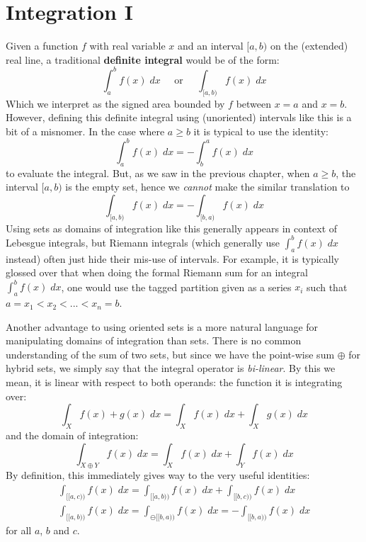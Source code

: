 \chapter{Integration I}


%
%

Given a function $f$ with real variable $x$ and an interval $[a,b)$ on the (extended) real line, 
a traditional \textbf{definite integral} would be of the form:
\begin{equation*}
	\int_a^b f(x) \; dx \;\;\;\;\; \text{or} \;\;\;\;\; \int_{[a,b)} f(x) \; dx
\end{equation*}
Which we interpret as the signed area bounded by $f$ between $x=a$ and $x=b$.
However, defining this definite integral using (unoriented) intervals like this is a bit of a misnomer.
In the case where $a \geq b$ it is typical to use the identity:
\begin{equation}
	\int_a^b f(x) \; dx = - \int_b^a f(x) \; dx
\end{equation}
to evaluate the integral.
But, as we saw in the previous chapter, when $a \geq b$, the interval $[a,b)$ is the empty set,
hence we \emph{cannot} make the similar translation to 
\begin{equation}
	\int_{[a,b)} f(x) \; dx = - \int_{[b,a)} f(x) \; dx
\end{equation}
Using sets as domains of integration like this generally appears in context of Lebesgue integrals, but 
Riemann integrals (which generally use $\int_a^b f(x) \;dx$ instead) often just hide their mis-use of intervals.
For example, it is typically glossed over that when doing the formal Riemann sum for an integral $\int_a^b f(x) \; dx$, 
one would use the tagged partition given as a series $x_i$ such that $a = x_1 < x_2 < ... < x_n = b$.


Another advantage to using oriented sets is a more natural language for manipulating domains of integration than sets.
There is no common understanding of the sum of two sets, but since we have the point-wise sum $\oplus$ for hybrid sets, we simply say that the integral operator is \emph{bi-linear}.
By this we mean, it is linear with respect to both operands: the function it is integrating over:
\begin{equation}
	\int_{X} f(x) + g(x) \; dx = \int_X f(x) \;dx + \int_X g(x) \; dx
\end{equation}
and the domain of integration:
\begin{equation}
	\int_{X\oplus Y} f(x) \; dx = \int_{X} f(x) \; dx + \int_Y f(x) \; dx
\end{equation}
By definition, this immediately gives way to the very useful identities:
\begin{align}
	\int_{[\![a,c)\!)} f(x) \; dx = \int_{[\![a,b)\!)} f(x) \; dx + \int_{[\![b,c)\!)} f(x) \; dx \\
	\int_{[\![a,b)\!)} f(x) \; dx = \int_{\ominus [\![b,a)\!)} f(x) \; dx = - \int_{[\![b,a)\!)} f(x) \; dx
\end{align}
for all $a$, $b$ and $c$.


